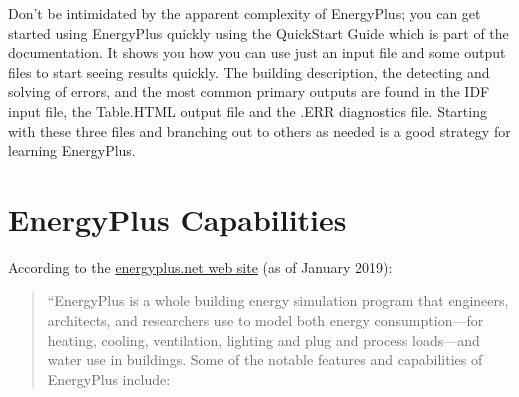 Don't be intimidated by the apparent complexity of EnergyPlus; you
can get started using EnergyPlus quickly using the QuickStart Guide
which is part of the documentation. It shows you how you can use just
an input file and some output files to start seeing results quickly.
The building description, the detecting and solving of errors, and
the most common primary outputs are found in the IDF input file, the
Table.HTML output file and the .ERR diagnostics file. Starting with
these three files and branching out to others as needed is a good
strategy for learning EnergyPlus.

\section{EnergyPlus Capabilities}

According to the \href{https://energyplus.net/}{energyplus.net web site}
(as of January 2019):
\begin{quotation}
``EnergyPlus\texttrademark{} is a whole building energy simulation
program that engineers, architects, and researchers use to model both
energy consumption---for heating, cooling, ventilation, lighting
and plug and process loads---and water use in buildings. Some of
the notable features and capabilities of EnergyPlus include:
\end{quotation}

